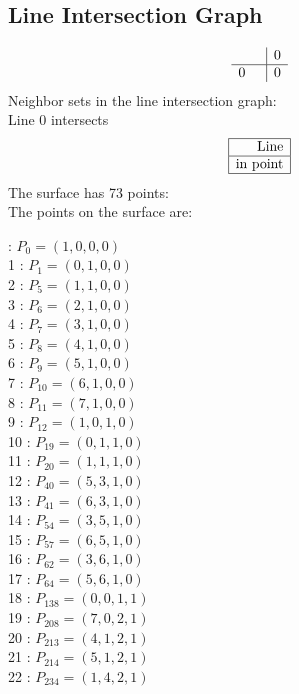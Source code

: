 \documentclass{article}
\begin{document}
{\subsection*{Line Intersection Graph}
{\arraycolsep=1pt
$$
\begin{array}{rr|*{1}r}
 &  & 0\\
\hline
0 &  & 0\\
\end{array}
$$
}%
Neighbor sets in the line intersection graph:\\
Line 0 intersects 
$$
\begin{array}{|r*{0}{|c}|}
\hline
\mbox{Line} \\
\hline
\mbox{in point} \\
\hline
\end{array}
$$
The surface has 73 points:\\
The points on the surface are:\\
\begin{multicols}{3}
 : $P_{0}=( 1, 0, 0, 0 )$\\
1 : $P_{1}=( 0, 1, 0, 0 )$\\
2 : $P_{5}=( 1, 1, 0, 0 )$\\
3 : $P_{6}=( 2, 1, 0, 0 )$\\
4 : $P_{7}=( 3, 1, 0, 0 )$\\
5 : $P_{8}=( 4, 1, 0, 0 )$\\
6 : $P_{9}=( 5, 1, 0, 0 )$\\
7 : $P_{10}=( 6, 1, 0, 0 )$\\
8 : $P_{11}=( 7, 1, 0, 0 )$\\
9 : $P_{12}=( 1, 0, 1, 0 )$\\
10 : $P_{19}=( 0, 1, 1, 0 )$\\
11 : $P_{20}=( 1, 1, 1, 0 )$\\
12 : $P_{40}=( 5, 3, 1, 0 )$\\
13 : $P_{41}=( 6, 3, 1, 0 )$\\
14 : $P_{54}=( 3, 5, 1, 0 )$\\
15 : $P_{57}=( 6, 5, 1, 0 )$\\
16 : $P_{62}=( 3, 6, 1, 0 )$\\
17 : $P_{64}=( 5, 6, 1, 0 )$\\
18 : $P_{138}=( 0, 0, 1, 1 )$\\
19 : $P_{208}=( 7, 0, 2, 1 )$\\
20 : $P_{213}=( 4, 1, 2, 1 )$\\
21 : $P_{214}=( 5, 1, 2, 1 )$\\
22 : $P_{234}=( 1, 4, 2, 1 )$\\

\end{multicols}}
\end{document}
